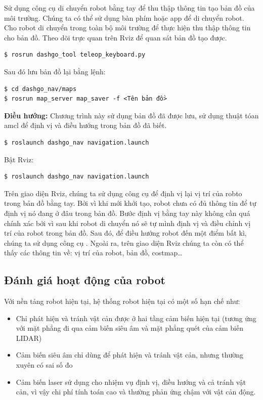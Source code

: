 Sử dụng công cụ di chuyển robot bằng tay để thu thập thông tin tạo bản đồ của môi trường. Chúng ta có thể sử dụng bàn phím hoặc app để di chuyển robot. Cho robot di chuyển trong toàn bộ môi trường để thực hiện thu thập thông tin cho bản đồ. Theo dõi trực quan trên Rviz để quan sát bản đồ tạo được.
\begin{lstlisting}
$ rosrun dashgo_tool teleop_keyboard.py 
\end{lstlisting}

Sau đó lưu bản đồ lại bằng lệnh: 
\begin{lstlisting}
$ cd dashgo_nav/maps
$ rosrun map_server map_saver -f <Tên bản đồ>
\end{lstlisting}

\textbf{Điều hướng:} Chương trình này sử dụng bản đồ đã được lưu, sử dụng thuật tóan amcl để định vị và điều hướng trong bản đồ đã biết.
\begin{lstlisting}
$ roslaunch dashgo_nav navigation.launch
\end{lstlisting}

Bật Rviz:
\begin{lstlisting}
$ roslaunch dashgo_nav navigation.launch
\end{lstlisting}
Trên giao diện Rviz, chúng ta sử dụng công cụ  để định vị lại vị trí của robto trong bản đồ bằng tay. Bởi vì khi mới khởi tạo, robot chưa có đủ thông tin để tự định vị nó đang ở đâu trong bản đồ. Bước định vị bằng tay này không cần quá chính xác bởi vì sau khi robot di chuyển nó sẽ tự mình định vị và điều chỉnh vị trí của robot trong bản đồ. Sau đó, để điều hướng robot đến một điểm bất kì, chúng ta sử dụng công cụ . Ngoài ra, trên giao diện Rviz chúng ta còn có thể thấy các thông tin về: vị trí của robot, bản đồ, costmap\dots

\subsection{Đánh giá hoạt động của robot}

Với nền tảng robot hiện tại, hệ thống robot hiện tại có một số hạn chế như: 
\begin{itemize}
    \item Chỉ phát hiện và tránh vật cản được ở hai tầng cảm biến hiện tại (tương ứng với mặt phẳng đi qua cảm biến siêu âm và mặt phẳng quét của cảm biến LIDAR)
    \item Cảm biến siêu âm chỉ dùng để phát hiện và tránh vật cản, nhưng thường xuyên có sai số đo
    \item Cảm biến laser sử dụng cho nhiệm vụ định vị, điều hướng và cả tránh vật cản, vì vậy chi phí tính toán cao và thường phản ứng chậm với vật cản động. 
\end{itemize}

